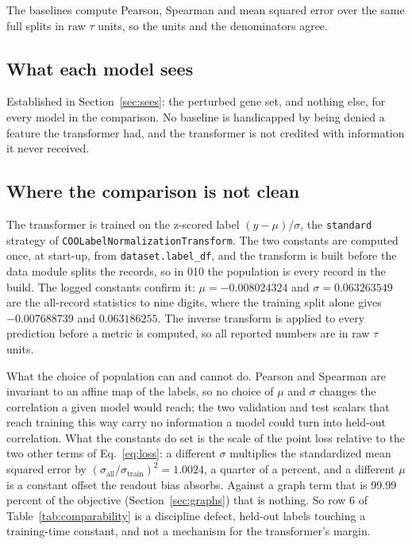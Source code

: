 The baselines compute Pearson, Spearman and mean squared error over the same
full splits in raw $\tau$ units, so the units and the denominators agree.

\subsection{What each model sees}

Established in Section~\ref{sec:sees}: the perturbed gene set, and nothing else,
for every model in the comparison. No baseline is handicapped by being denied a
feature the transformer had, and the transformer is not credited with
information it never received.

\subsection{Where the comparison is not clean}

\label{sec:normleak}
The transformer is trained on the z-scored label $(y - \mu) / \sigma$, the
\texttt{standard} strategy of \texttt{COOLabelNormalizationTransform}. The two
constants are computed once, at start-up, from \texttt{dataset.label\_df}, and
the transform is built before the data module splits the records, so in 010 the
population is every record in the build. The logged constants confirm it:
$\mu = -0.008024324$ and $\sigma = 0.063263549$ are the all-record statistics to
nine digits, where the training split alone gives $-0.007688739$ and
$0.063186255$. The inverse transform is applied to every prediction before a
metric is computed, so all reported numbers are in raw $\tau$ units.

What the choice of population can and cannot do. Pearson and Spearman are
invariant to an affine map of the labels, so no choice of $\mu$ and $\sigma$
changes the correlation a given model would reach; the two validation and test
scalars that reach training this way carry no information a model could turn
into held-out correlation. What the constants do set is the scale of the point
loss relative to the two other terms of Eq.~\ref{eq:loss}: a different $\sigma$
multiplies the standardized mean squared error by $(\sigma_{\mathrm{all}} /
\sigma_{\mathrm{train}})^2 = 1.0024$, a quarter of a percent, and a different
$\mu$ is a constant offset the readout bias absorbs. Against a graph term that is
99.99 percent of the objective (Section~\ref{sec:graphs}) that is nothing. So
row 6 of Table~\ref{tab:comparability} is a discipline defect, held-out labels
touching a training-time constant, and not a mechanism for the transformer's
margin.

